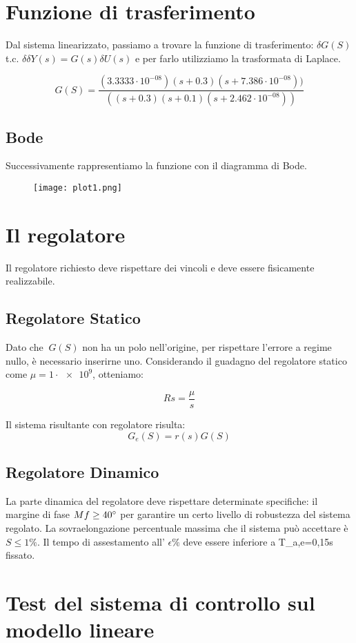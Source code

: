 \documentclass{article}
\begin{document}
\section{Funzione di trasferimento}
Dal sistema linearizzato, passiamo a trovare la funzione di trasferimento: $\delta G(S)$ t.c. $\delta δY (s) = G(s)δU (s)$ e per farlo utilizziamo la trasformata di Laplace.



\[
G(S) = \frac{(3.3333\cdot 10^{-08}) (s+0.3) (s+7.386\cdot 10^{-08}))} {((s+0.3) (s+0.1) (s+2.462\cdot 10^{-08}))}
\]

\subsection{Bode}

Successivamente rappresentiamo la funzione con il diagramma di Bode.

\begin{figure}[!h]
\centering
\texttt{[image: plot1.png]}
\end{figure}

\section{Il regolatore}

Il regolatore richiesto deve rispettare dei vincoli e deve essere fisicamente realizzabile.
\subsection{Regolatore Statico}

Dato che $\ G(S)$ non ha un polo nell'origine, per rispettare l'errore a regime nullo, è necessario inserirne uno. Considerando il guadagno del regolatore statico come  $ \mu = 1 \cdot \num{e9}$, otteniamo:

\[ Rs = \frac{\mu}{s}  \]


Il sistema risultante con regolatore risulta:
\[ G_e(S) = r(s)G(S) \]

\subsection{Regolatore Dinamico}
La parte dinamica del regolatore deve rispettare determinate specifiche: il margine di fase $ Mf \geq 40\degree $ per garantire un certo livello di robustezza del sistema regolato. 
La sovraelongazione percentuale massima che il sistema può accettare è $ S \leq 1\% $. Il tempo di assestamento all' $ \epsilon\% $ deve essere inferiore a T_a,e=0,15s fissato.


\section{Test del sistema di controllo sul modello lineare}
\end{document}
